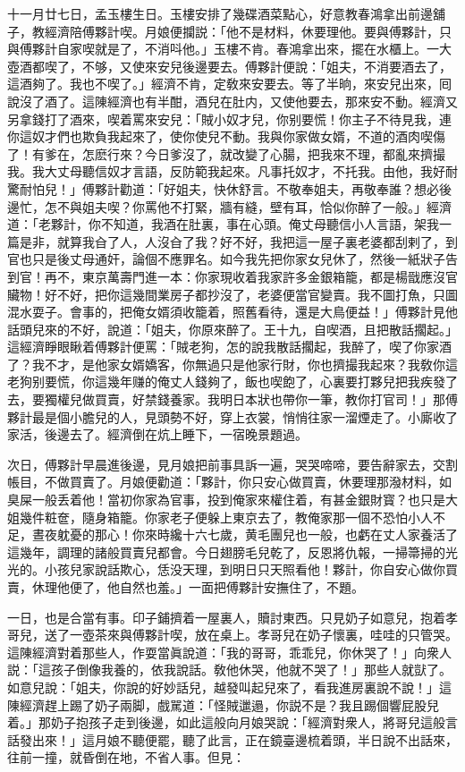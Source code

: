 十一月廿七日，孟玉樓生日。玉樓安排了幾碟酒菜點心，好意教春鴻拿出前邊舖子，教經濟陪傅夥計喫。月娘便攔説：「他不是材料，休要理他。要與傅夥計，只與傅夥計自家喫就是了，不消呌他。」玉樓不肯。春鴻拿出來，擺在水櫃上。一大壺酒都喫了，不够，又使來安兒後邊要去。傅夥計便說：「姐夫，不消要酒去了，這酒夠了。我也不喫了。」經濟不肯，定敎來安要去。等了半晌，來安兒出來，囘說沒了酒了。這陳經濟也有半酣，酒兒在肚内，又使他要去，那來安不動。經濟又另拿錢打了酒來，喫着罵來安兒：「賊小奴才兒，你别要慌！你主子不待見我，連你這奴才們也欺負我起來了，使你使兒不動。我與你家做女婿，不道的酒肉喫傷了！有爹在，怎麽行來？今日爹沒了，就改變了心腸，把我來不理，都亂來擠撮我。我大丈母聽信奴才言語，反防範我起來。凡事托奴才，不托我。由他，我好耐驚耐怕兒！」傅夥計勸道：「好姐夫，快休舒言。不敬奉姐夫，再敬奉誰？想必後邊忙，怎不與姐夫喫？你罵他不打緊，牆有縫，壁有耳，恰似你醉了一般。」經濟道：「老夥計，你不知道，我酒在肚裏，事在心頭。俺丈母聽信小人言語，架我一篇是非，就算我㒲了人，人沒㒲了我？好不好，我把這一屋子裏老婆都刮剌了，到官也只是後丈母通奸，論個不應罪名。如今我先把你家女兒休了，然後一紙狀子告到官！再不，東京萬壽門進一本：你家現收着我家許多金銀箱籠，都是楊戩應沒官贜物！好不好，把你這幾間業房子都抄沒了，老婆便當官變賣。我不圖打魚，只圖混水耍子。會事的，把俺女婿須收籠着，照舊看待，還是大鳥便益！」傅夥計見他話頭兒來的不好，說道：「姐夫，你原來醉了。王十九，自喫酒，且把散話擱起。」這經濟睜眼瞅着傅夥計便罵：「賊老狗，怎的說我散話擱起，我醉了，喫了你家酒了？我不才，是他家女婿嬌客，你無過只是他家行財，你也擠撮我起來？我敎你這老狗别要慌，你這幾年赚的俺丈人錢夠了，飯也喫飽了，心裏要打夥兒把我疾發了去，要獨權兒做買賣，好禁錢養家。我明日本狀也帶你一筆，教你打官司！」那傅夥計最是個小膽兒的人，見頭勢不好，穿上衣裳，悄悄往家一溜煙走了。小廝收了家活，後邊去了。經濟倒在炕上睡下，一宿晚景題過。

次日，傅夥計早晨進後邊，見月娘把前事具訴一遍，哭哭啼啼，要告辭家去，交割帳目，不做買賣了。月娘便勸道：「夥計，你只安心做買賣，休要理那潑材料，如臭屎一般丢着他！當初你家為官事，投到俺家來權住着，有甚金銀財寳？也只是大姐幾件粧奩，隨身箱籠。你家老子便躲上東京去了，教俺家那一個不恐怕小人不足，晝夜躭憂的那心！你來時纔十六七歲，黄毛團兒也一般，也虧在丈人家養活了這幾年，調理的諸般買賣兒都會。今日翅膀毛兒乾了，反恩將仇報，一掃箒掃的光光的。小孩兒家說話欺心，恁没天理，到明日只天照看他！夥計，你自安心做你買賣，休理他便了，他自然也羞。」一面把傅夥計安撫住了，不題。

一日，也是合當有事。印子鋪擠着一屋裏人，贖討東西。只見奶子如意兒，抱着孝哥兒，送了一壺茶來與傅夥計喫，放在桌上。孝哥兒在奶子懷裏，哇哇的只管哭。這陳經濟對着那些人，作耍當眞說道：「我的哥哥，乖乖兒，你休哭了！」向衆人説：「這孩子倒像我養的，依我說話。敎他休哭，他就不哭了！」那些人就獃了。如意兒說：「姐夫，你說的好妙話兒，越發叫起兒來了，看我進房裏說不說！」這陳經濟趕上踢了奶子兩脚，戲駡道：「怪賊邋遢，你説不是？我且踢個響屁股兒着。」那奶子抱孩子走到後邊，如此這般向月娘哭說：「經濟對衆人，將哥兒這般言話發出來！」這月娘不聽便罷，聽了此言，正在鏡臺邊梳着頭，半日說不出話來，往前一撞，就昏倒在地，不省人事。但見：

